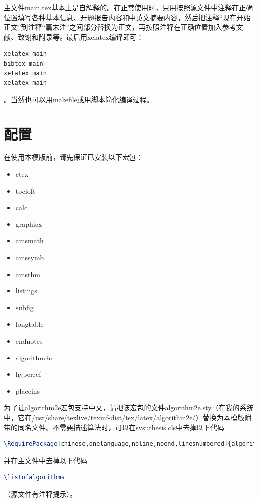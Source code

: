 ﻿\documentclass{sysuthesis}
\begin{document}
主文件{\ttfamily main.tex}基本上是自解释的。在正常使用时，只用按照源文件中注释在正确位置填写各种基本信息、开题报告内容和中英文摘要内容，然后把注释``现在开始正文''到注释``篇末注''之间部分替换为正文，再按照注释在正确位置加入参考文献、致谢和附录等。最后用{\ttfamily xelatex}编译即可：

\begin{lstlisting}[language=bash, keywordstyle=\color{blue}\bfseries, basicstyle=\ttfamily, breaklines=true, frame=shadowbox]
xelatex main
bibtex main
xelatex main
xelatex main
\end{lstlisting}
。当然也可以用{\ttfamily makefile}或用脚本简化编译过程。

\section{配置}

在使用本模版前，请先保证已安装以下宏包：

\begin{itemize}
\item {\ttfamily ctex}
\item {\ttfamily tocloft}
\item {\ttfamily calc}
\item {\ttfamily graphicx}
\item {\ttfamily amsmath}
\item {\ttfamily amssymb}
\item {\ttfamily amsthm}
\item {\ttfamily listings}
\item {\ttfamily subfig}
\item {\ttfamily longtable}
\item {\ttfamily endnotes}
\item {\ttfamily algorithm2e}
\item {\ttfamily hyperref}
\item {\ttfamily placeins}
\end{itemize}

为了让{\ttfamily algorithm2e}宏包支持中文，请把该宏包的文件{\ttfamily algorithm2e.sty}（在我的系统中，它在{\ttfamily /usr/share/texlive/texmf-dist/tex/latex/algorithm2e/}）替换为本模版附带的同名文件。不需要描述算法时，可以在{\ttfamily sysuthesis.cls}中去掉以下代码
\begin{lstlisting}[language=TeX, keywordstyle=\color{blue}\bfseries, basicstyle=\ttfamily, breaklines=true, frame=shadowbox]
\RequirePackage[chinese,onelanguage,noline,noend,linesnumbered]{algorithm2e}
\end{lstlisting}
并在主文件中去掉以下代码
\begin{lstlisting}[language=TeX, keywordstyle=\color{blue}\bfseries, basicstyle=\ttfamily, breaklines=true, frame=shadowbox]
\listofalgorithms
\end{lstlisting}
（源文件有注释提示）。
\end{document}
